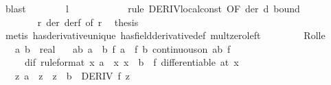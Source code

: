 \begin{isabellebody}
\ blast\isanewline
\ \ \ \ \ \ \isamarkupfalse%
\ {\isachardoublequoteopen}l\ {\isacharequal}{\kern0pt}\ {}{\isachardoublequoteclose}\isanewline
\ \ \ \ \ \ \ \ \isamarkupfalse%
\ {\isacharparenleft}{\kern0pt}rule\ DERIV{\isacharunderscore}{\kern0pt}local{\isacharunderscore}{\kern0pt}const\ {\isacharbrackleft}{\kern0pt}OF\ der\ d\ bound{\isacharprime}{\kern0pt}{\isacharbrackright}{\kern0pt}{\isacharparenright}{\kern0pt}\isanewline
\ \ \ \ \ \ \ \ %
\isanewline
\ \ \ \ \ \ \isamarkupfalse%
\ r\ der\ derf\ {\isacharbrackleft}{\kern0pt}of\ r{\isacharbrackright}{\kern0pt}\ \isamarkupfalse%
\ {\isacharquery}{\kern0pt}thesis\isanewline
\ \ \ \ \ \ \ \ \isamarkupfalse%
\ {\isacharparenleft}{\kern0pt}metis\ has{\isacharunderscore}{\kern0pt}derivative{\isacharunderscore}{\kern0pt}unique\ has{\isacharunderscore}{\kern0pt}field{\isacharunderscore}{\kern0pt}derivative{\isacharunderscore}{\kern0pt}def\ mult{\isacharunderscore}{\kern0pt}zero{\isacharunderscore}{\kern0pt}left{\isacharparenright}{\kern0pt}\isanewline
\ \ \ \ \isamarkupfalse%
\isanewline
\ \ \isamarkupfalse%
\isanewline
{}\isamarkupfalse%
%
\endisatagproof
{\isafoldproof}%
%
\isadelimproof
\isanewline
%
\endisadelimproof
\isanewline
{}\isamarkupfalse%
\ Rolle{\isacharcolon}{\kern0pt}\isanewline
\ \ \ a\ b\ {\isacharcolon}{\kern0pt}{\isacharcolon}{\kern0pt}\ real\isanewline
\ \ \ ab{\isacharcolon}{\kern0pt}\ {\isachardoublequoteopen}a\ {\isacharless}{\kern0pt}\ b{\isachardoublequoteclose}\ {\isachardoublequoteopen}f\ a\ {\isacharequal}{\kern0pt}\ f\ b{\isachardoublequoteclose}\ {\isachardoublequoteopen}continuous{\isacharunderscore}{\kern0pt}on\ {\isacharbraceleft}{\kern0pt}a{\isachardot}{\kern0pt}{\isachardot}{\kern0pt}b{\isacharbraceright}{\kern0pt}\ f{\isachardoublequoteclose}\isanewline
\ \ \ \ \ dif\ {\isacharbrackleft}{\kern0pt}rule{\isacharunderscore}{\kern0pt}format{\isacharbrackright}{\kern0pt}{\isacharcolon}{\kern0pt}\ {\isachardoublequoteopen}{\isasymAnd}x{\isachardot}{\kern0pt}\ {\isasymlbrakk}a\ {\isacharless}{\kern0pt}\ x{\isacharsemicolon}{\kern0pt}\ x\ {\isacharless}{\kern0pt}\ b{\isasymrbrakk}\ {\isasymLongrightarrow}\ f\ differentiable\ {\isacharparenleft}{\kern0pt}at\ x{\isacharparenright}{\kern0pt}{\isachardoublequoteclose}\isanewline
\ \ \ {\isachardoublequoteopen}{\isasymexists}z{\isachardot}{\kern0pt}\ a\ {\isacharless}{\kern0pt}\ z\ {\isasymand}\ z\ {\isacharless}{\kern0pt}\ b\ {\isasymand}\ DERIV\ f\ z\ {\isacharcolon}{\kern0pt}{\isachargreater}{\kern0pt}\ {}{\isachardoublequoteclose}\isanewline

\end{isabellebody}
